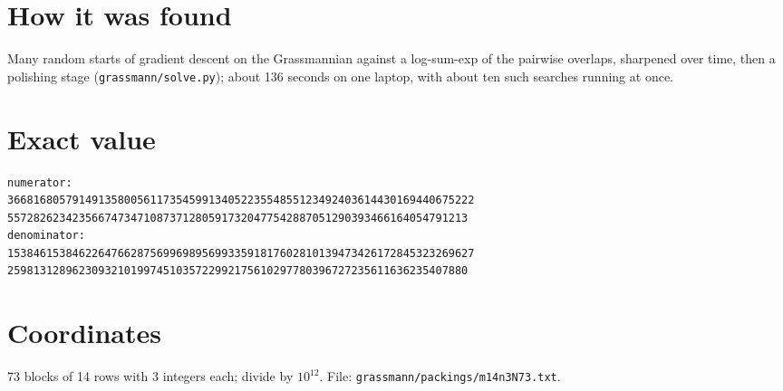 \documentclass[11pt,a4paper]{article}
\begin{document}
\section{How it was found}
Many random starts of gradient descent on the Grassmannian against a log-sum-exp of the pairwise overlaps, sharpened over time, then a polishing stage (\texttt{grassmann/solve.py}); about 136 seconds on one laptop, with about ten such searches running at once.


\appendix
\section{Exact value}
{\small
\begin{verbatim}
numerator:
366816805791491358005611735459913405223554855123492403614430169440675222
55728262342356674734710873712805917320477542887051290393466164054791213
denominator:
153846153846226476628756996989569933591817602810139473426172845323269627
25981312896230932101997451035722992175610297780396727235611636235407880
\end{verbatim}}

\section{Coordinates}
73 blocks of 14 rows with 3 integers each; divide by $10^{12}$. File: \texttt{grassmann/packings/m14n3N73.txt}.
{\tiny
\begin{multicols}{3}
\end{multicols}}
\end{document}
